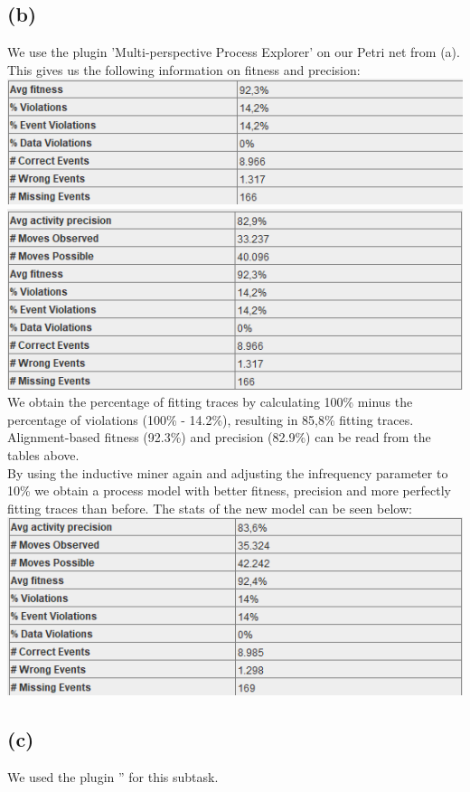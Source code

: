 \documentclass[../../main.tex]{subfiles}
\begin{document}
\subsection*{(b)}
We use the plugin 'Multi-perspective Process Explorer' on our Petri net from (a). This gives us the following information on fitness and precision:\\
\includegraphics[width=0.5\columnwidth]{img/ProM_b_fitness.png}
\includegraphics[width=0.5\columnwidth]{img/ProM_b_precision.png}\\
We obtain the percentage of fitting traces by calculating 100\% minus the percentage of violations (100\% - 14.2\%), resulting in 85,8\% fitting traces. Alignment-based fitness (92.3\%) and precision (82.9\%) can be read from the tables above.\\
By using the inductive miner again and adjusting the infrequency parameter to 10\% we obtain a process model with better fitness, precision and more perfectly fitting traces than before. The stats of the new model can be seen below:\\
\includegraphics[width=0.5\columnwidth]{img/ProM_b_model_2.png}

\subsection*{(c)}
We used the plugin '' for this subtask.
\end{document}
